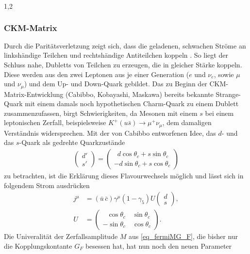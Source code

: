 \documentclass[11pt,a4paper,twoside,draft]{report}
\begin{document}
\begin{spacing}{1,2}
\subsubsection{CKM-Matrix}
Durch die Paritätsverletzung zeigt sich, dass die geladenen, schwachen Ströme an linkshändige Teilchen und rechtshändige Antiteilchen koppeln \cite{DissForm}\cite{Sibold}. 
So liegt der Schluss nahe, Dubletts von Teilchen zu erzeugen, die in gleicher Stärke koppeln. Diese werden aus den zwei Leptonen aus je einer Generation 
($e$ und $\nu_e$, sowie $\mu$ und $\nu_\mu$) und dem Up- und Down-Quark gebildet. Das zu Beginn der CKM-Matrix-Entwicklung (Cabibbo, Kobayashi, Maskawa) 
bereits bekannte Strange-Quark
mit einem damals noch hypothetischen Charm-Quark zu einem Dublett zusammenzufassen, birgt Schwierigkeiten, da Mesonen mit einem $s$ bei einem leptonischen
Zerfall, beispielsweise $K^+(u\bar s) \rightarrow \mu^+ \nu_\mu$, dem damaligen Verständnis widersprechen. Mit der von Cabibbo entworfenen Idee, das $d$-
und das $s$-Quark als gedrehte Quarkzustände 
\begin{align}
 \begin{pmatrix}
  d'\\
  s'
 \end{pmatrix} = \begin{pmatrix}
		  \,\,\,d \cos \theta_c + s \sin \theta_c\\
		  -d \sin \theta_c + s\cos \theta_c
		  \end{pmatrix}
\end{align}
zu betrachten, ist die Erklärung dieses Flavourwechsels möglich und lässt sich in folgendem Strom ausdrücken
\begin{align}
 j^\mu &= (\bar u\, \bar c) \gamma^\mu (1-\gamma_5) U \begin{pmatrix}
                                                      d\\
                                                      s
                                                     \end{pmatrix},\\
 U &= \begin{pmatrix}
      \,\,\,\,\cos \theta_c\quad \sin \theta_c\\
      -\sin \theta_c\quad \cos \theta_c
     \end{pmatrix}.
\end{align}
Die Univeralität der Zerfallsamplitude $M$ aus \eqref{eq_fermiMG_F}, die bisher nur die Kopplungskontante $G_F$ besessen hat, hat nun noch den neuen Parameter

\end{spacing}
\end{document}
